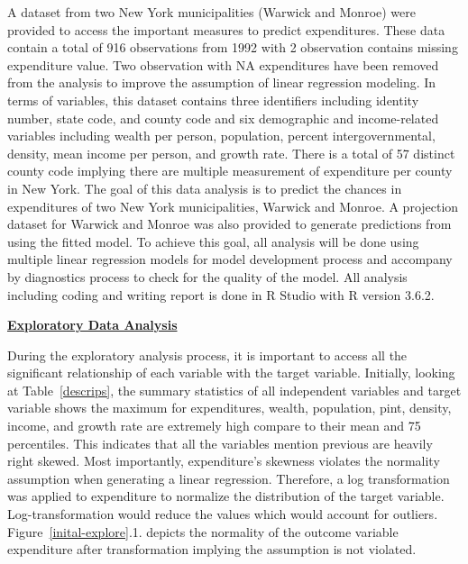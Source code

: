 \documentclass[11pt]{article}\usepackage[]{graphicx}\usepackage[]{color}
\begin{document}
\noindent A dataset from two New York municipalities (Warwick and Monroe) were provided to access the important measures to predict expenditures. These data contain a total of 916 observations from 1992 with 2 observation contains missing expenditure value. Two observation with NA expenditures have been removed from the analysis to improve the assumption of linear regression modeling. In terms of variables, this dataset contains three identifiers including identity number, state code, and county code and six demographic and income-related variables including wealth per person, population, percent intergovernmental, density, mean income per person, and growth rate. There is a total of 57 distinct county code implying there are multiple measurement of expenditure per county in New York. The goal of this data analysis is to predict the chances in expenditures of two New York municipalities, Warwick and Monroe. A projection dataset for Warwick and Monroe was also provided to generate predictions from using the fitted model. To achieve this goal, all analysis will be done using multiple linear regression models for model development process and accompany by diagnostics process to check for the quality of the model. All analysis including coding and writing report is done in R Studio with R version 3.6.2.    
\hfill \break

\noindent\textbf{\underline{Exploratory Data Analysis}} 

\noindent During the exploratory analysis process, it is important to access all the significant relationship of each variable with the target variable. Initially, looking at Table~\ref{descrips}, the summary statistics of all independent variables and target variable shows the maximum for expenditures, wealth, population, pint, density, income, and growth rate are extremely high compare to their mean and 75 percentiles. This indicates that all the variables mention previous are heavily right skewed. Most importantly, expenditure's skewness violates the normality assumption when generating a linear regression. Therefore, a log transformation was applied to expenditure to normalize the distribution of the target variable. Log-transformation would reduce the values which would account for outliers. Figure~\ref{inital-explore}.1. depicts the normality of the outcome variable expenditure after transformation implying the assumption is not violated.
\end{document}

